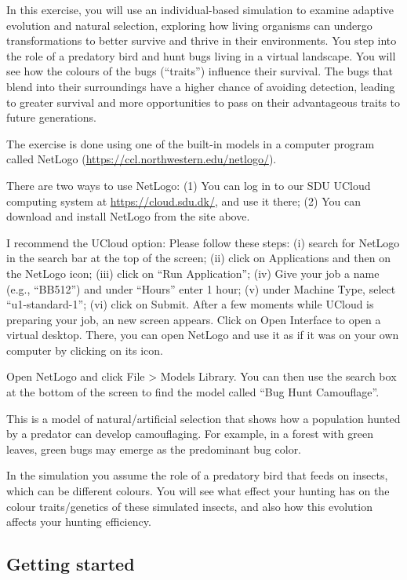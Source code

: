 \documentclass[
  a4paper]{book}
\begin{document}
In this exercise, you will use an individual-based simulation to examine adaptive evolution and natural selection, exploring how living organisms can undergo transformations to better survive and thrive in their environments. You step into the role of a predatory bird and hunt bugs living in a virtual landscape. You will see how the colours of the bugs (``traits'') influence their survival. The bugs that blend into their surroundings have a higher chance of avoiding detection, leading to greater survival and more opportunities to pass on their advantageous traits to future generations.

The exercise is done using one of the built-in models in a computer program called NetLogo (\url{https://ccl.northwestern.edu/netlogo/}).

There are two ways to use NetLogo: (1) You can log in to our SDU UCloud computing system at \url{https://cloud.sdu.dk/}, and use it there; (2) You can download and install NetLogo from the site above.

I recommend the UCloud option: Please follow these steps: (i) search for NetLogo in the search bar at the top of the screen; (ii) click on Applications and then on the NetLogo icon; (iii) click on ``Run Application''; (iv) Give your job a name (e.g., ``BB512'') and under ``Hours'' enter 1 hour; (v) under Machine Type, select ``u1-standard-1''; (vi) click on Submit. After a few moments while UCloud is preparing your job, an new screen appears. Click on Open Interface to open a virtual desktop. There, you can open NetLogo and use it as if it was on your own computer by clicking on its icon.

Open NetLogo and click File \textgreater{} Models Library. You can then use the search box at the bottom of the screen to find the model called ``Bug Hunt Camouflage''.

This is a model of natural/artificial selection that shows how a population hunted by a predator can develop camouflaging. For example, in a forest with green leaves, green bugs may emerge as the predominant bug color.

In the simulation you assume the role of a predatory bird that feeds on insects, which can be different colours. You will see what effect your hunting has on the colour traits/genetics of these simulated insects, and also how this evolution affects your hunting efficiency.

\subsection{Getting started}\label{getting-started}
\end{document}
